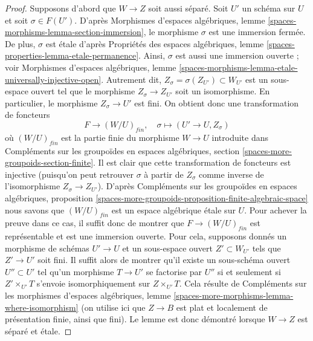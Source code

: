 \begin{proof}
Supposons d'abord que $W \to Z$ soit aussi séparé.
Soit $U'$ un schéma sur $U$ et soit $\sigma \in F(U')$. D'après
Morphismes d'espaces algébriques, lemme \ref{spaces-morphisms-lemma-section-immersion},
le morphisme $\sigma$ est une immersion fermée.
De plus, $\sigma$ est étale d'après
Propriétés des espaces algébriques, lemme \ref{spaces-properties-lemma-etale-permanence}.
Ainsi, $\sigma$ est aussi une immersion ouverte ; voir
Morphismes d'espaces algébriques,
lemme \ref{spaces-morphisms-lemma-etale-universally-injective-open}.
Autrement dit, $Z_\sigma = \sigma(Z_{U'}) \subset W_{U'}$ est
un sous-espace ouvert tel que le morphisme $Z_\sigma \to Z_{U'}$
soit un isomorphisme. En particulier, le morphisme $Z_\sigma \to U'$
est fini. On obtient donc une transformation de foncteurs
$$
F \longrightarrow (W/U)_{fin}, \quad
\sigma \longmapsto (U' \to U, Z_\sigma)
$$
où $(W/U)_{fin}$ est la partie finie du morphisme $W \to U$
introduite dans
Compléments sur les groupoïdes en espaces algébriques, section
\ref{spaces-more-groupoids-section-finite}.
Il est clair que cette transformation de foncteurs est injective (puisqu'on peut
retrouver $\sigma$ à partir de $Z_\sigma$ comme inverse de l'isomorphisme
$Z_\sigma \to Z_{U'}$). D'après
Compléments sur les groupoïdes en espaces algébriques, proposition
\ref{spaces-more-groupoids-proposition-finite-algebraic-space}
nous savons que $(W/U)_{fin}$ est un espace algébrique étale sur $U$.
Pour achever la preuve dans ce cas, il suffit donc de montrer que
$F \to (W/U)_{fin}$ est représentable et est une immersion ouverte.
Pour cela, supposons donnés un morphisme de schémas $U' \to U$
et un sous-espace ouvert $Z' \subset W_{U'}$ tels que $Z' \to U'$
soit fini. Il suffit alors de montrer qu'il existe un
sous-schéma ouvert $U'' \subset U'$ tel qu'un morphisme
$T \to U'$ se factorise par $U''$ si et seulement si $Z' \times_{U'} T$
s'envoie isomorphiquement sur $Z \times_{U'} T$. Cela résulte de
Compléments sur les morphismes d'espaces algébriques, lemme
\ref{spaces-more-morphisms-lemma-where-isomorphism}
(on utilise ici que $Z \to B$ est plat et localement de présentation finie,
ainsi que fini).
Le lemme est donc démontré lorsque $W \to Z$ est séparé
et étale.


\end{proof}
